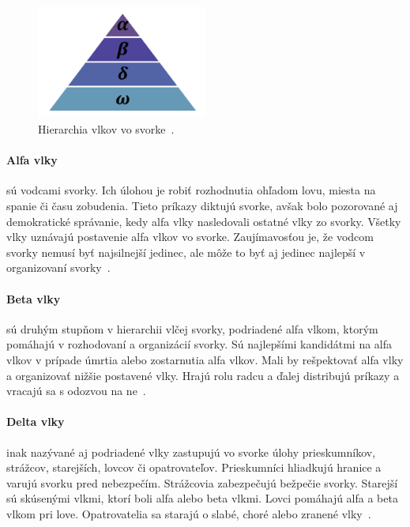 \documentclass[a4paper,slovak,12pt,appendix]{article}
\begin{document}
\begin{figure}[!ht]
  \centering
  \includegraphics[width=0.5\textwidth]{wolf_hierarchy.png}
  \caption{Hierarchia vlkov vo svorke~\cite{Seeley1991}.}
  \label{fig-wolf-hierarchy}
\end{figure}

\paragraph{Alfa vlky} sú vodcami svorky. Ich úlohou je robiť rozhodnutia
ohľadom lovu, miesta na spanie či času zobudenia. Tieto príkazy diktujú svorke,
avšak bolo pozorované aj demokratické správanie, kedy alfa vlky nasledovali
ostatné vlky zo svorky. Všetky vlky uznávajú postavenie alfa vlkov vo svorke.
Zaujímavosťou je, že vodcom svorky nemusí byť najsilnejší jedinec, ale môže to
byť aj jedinec najlepší v organizovaní svorky~\cite{Seeley1991}.

\paragraph{Beta vlky} sú druhým stupňom v hierarchii vlčej svorky, podriadené
alfa vlkom, ktorým pomáhajú v rozhodovaní a organizácií svorky. Sú najlepšími
kandidátmi na alfa vlkov v prípade úmrtia alebo zostarnutia alfa vlkov. Mali by
rešpektovať alfa vlky a organizovať nižšie postavené vlky. Hrajú rolu radcu
a ďalej distribujú príkazy a vracajú sa s odozvou na ne~\cite{Seeley1991}.

\paragraph{Delta vlky} inak nazývané aj podriadené vlky zastupujú vo svorke
úlohy prieskumníkov, strážcov, starejších, lovcov či opatrovateľov.
Prieskumníci hliadkujú hranice a varujú svorku pred nebezpečím. Strážcovia
zabezpečujú bežpečie svorky. Starejší sú skúsenými vlkmi, ktorí boli alfa alebo
beta vlkmi. Lovci pomáhajú alfa a beta vlkom pri love. Opatrovatelia sa starajú
o slabé, choré alebo zranené vlky~\cite{Seeley1991}.
\end{document}
